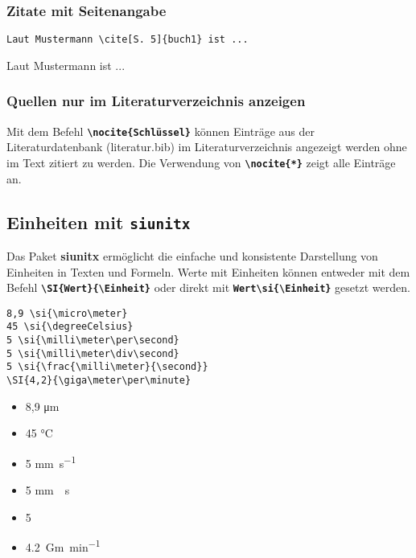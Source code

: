 \subsubsection{Zitate mit Seitenangabe}

\begin{minipage}[c]{0.48\textwidth}
    \begin{lstlisting}[language={[LaTeX]TeX}]
Laut Mustermann \cite[S. 5]{buch1} ist ...
    \end{lstlisting}
\end{minipage}
\hfill
\begin{minipage}[c]{0.48\textwidth}
    Laut Mustermann \cite[S. 5]{buch1} ist ...
\end{minipage}


\subsubsection{Quellen nur im Literaturverzeichnis anzeigen}
Mit dem Befehl \textbf{\texttt{\textbackslash nocite\{Schlüssel\}}} können Einträge aus der Literaturdatenbank (literatur.bib) im Literaturverzeichnis angezeigt werden ohne im Text zitiert zu werden.
Die Verwendung von \textbf{\texttt{\textbackslash nocite\{*\}}} zeigt alle Einträge an.


\subsection{Einheiten mit \texttt{siunitx}}

Das Paket \textbf{siunitx} ermöglicht die einfache und konsistente Darstellung von Einheiten in Texten und Formeln.
Werte mit Einheiten können entweder mit dem Befehl \textbf{\texttt{\textbackslash SI\{Wert\}\{\textbackslash Einheit\}}} oder direkt mit \textbf{\texttt{Wert\textbackslash si\{\textbackslash Einheit\}}} gesetzt werden.

\begin{minipage}[c]{0.6\textwidth}
    \begin{lstlisting}[language={[LaTeX]TeX}, lineskip=2pt]
8,9 \si{\micro\meter}               
45 \si{\degreeCelsius}              
5 \si{\milli\meter\per\second}      
5 \si{\milli\meter\div\second}      
5 \si{\frac{\milli\meter}{\second}} 
\SI{4,2}{\giga\meter\per\minute}    
    \end{lstlisting}
\end{minipage}
\hfill
\begin{minipage}[c]{0.3\textwidth}
    \begin{itemize}[itemsep=2pt, label=$\rightarrow$]
        \item 8,9 \si{\micro\meter}
        \item 45 \si{\degreeCelsius}
        \item 5 \si{\milli\meter\per\second}
        \item 5 \si{\milli\meter\div\second}
        \item 5 \si{\frac{\milli\meter}{\second}}
        \item \SI{4,2}{\giga\meter\per\minute}
    \end{itemize}
\end{minipage}


